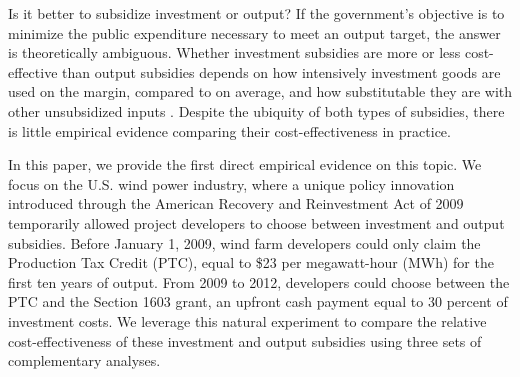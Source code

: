 \documentclass[12pt]{article}
\begin{document}
Is it better to subsidize investment or output? If the government's objective is to minimize the public expenditure necessary to meet an output target, the answer is theoretically ambiguous. Whether investment subsidies are more or less cost-effective than output subsidies depends on how intensively investment goods are used on the margin, compared to on average, and how substitutable they are with other unsubsidized inputs \citep{parish_relative_1982}. Despite the ubiquity of both types of subsidies, there is little empirical evidence comparing their cost-effectiveness in practice. 

In this paper, we provide the first direct empirical evidence on this topic. We focus on the U.S. wind power industry, where a unique policy innovation introduced through the American Recovery and Reinvestment Act of 2009 temporarily allowed project developers to choose between investment and output subsidies. Before January 1, 2009, wind farm developers could only claim the Production Tax Credit (PTC), equal to \$23 per megawatt-hour (MWh) for the first ten years of output. From 2009 to 2012, developers could choose between the PTC and the Section 1603 grant, an upfront cash payment equal to 30 percent of investment costs. We leverage this natural experiment to compare the relative cost-effectiveness of these investment and output subsidies using three sets of complementary analyses. 
\end{document}

